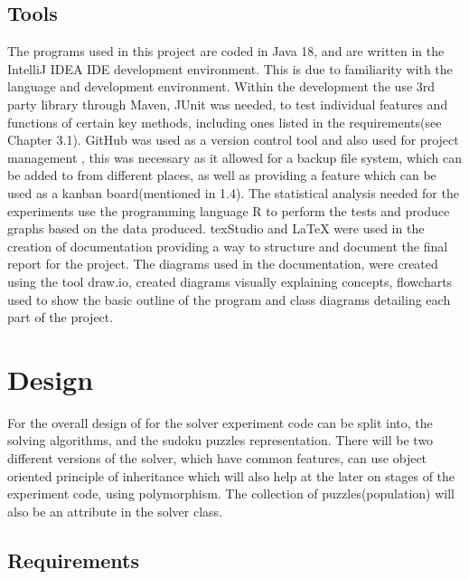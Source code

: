\documentclass[a4paper,11pt]{article}
\begin{document}
\subsection{Tools}
The programs used in this project are coded in Java 18, and are written in the IntelliJ IDEA IDE development environment. This is due to familiarity with the language and development environment. Within the development the use 3rd party library through Maven, JUnit was needed, to test individual features and functions of certain key methods, including ones listed in the requirements(see Chapter 3.1). GitHub was used as a version control tool and also used for project management , this was necessary as it allowed for a backup file system, which can be added to from different places, as well as providing a feature which can be used as a kanban board(mentioned in 1.4).
The statistical analysis needed for the experiments use the programming language R to perform the tests and produce graphs based on the data produced. texStudio and LaTeX were used in the creation of documentation providing a way to structure and document the final report for the project. The diagrams used in the documentation, were created using the tool draw.io, created diagrams visually explaining concepts, flowcharts used to show the basic outline of the program and class diagrams detailing each part of the project. 


\section{Design}
For the overall design of for the solver experiment code can be split into, the solving algorithms, and the sudoku puzzles representation. There will be two different versions of the solver, which have common features, can use object oriented principle of inheritance which will also help at the later on stages of the experiment code, using polymorphism. The collection of puzzles(population) will also be an attribute in the solver class.

\subsection{Requirements}
\end{document}
